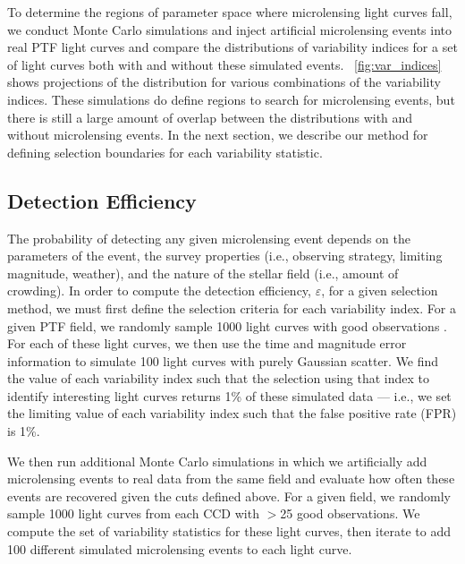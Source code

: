 \documentclass[12pt,preprint]{aastex}
\begin{document}
To determine the regions of parameter space where microlensing light curves fall, we conduct Monte Carlo simulations and inject artificial microlensing events into real PTF light curves and compare the distributions of variability indices for a set of light curves both with and without these simulated events. \figurename~\ref{fig:var_indices} shows projections of the distribution for various combinations of the variability indices. These simulations do define regions to search for microlensing events, but there is still a large amount of overlap between the distributions with and without microlensing events. In the next section, we describe our method for defining selection boundaries for each variability statistic.


\subsection{Detection Efficiency}
The probability of detecting any given microlensing event depends on the parameters of the event, the survey properties (i.e., observing strategy, limiting magnitude, weather), and the nature of the stellar field (i.e., amount of crowding). In order to compute the detection efficiency, $\varepsilon$, for a given selection method, we must first define the selection criteria for each variability index. For a given PTF field, we randomly sample 1000 light curves with good observations \citep[these have no photometric flags; see description of processing pipeline in][]{nick2009}. For each of these light curves, we then use the time and magnitude error information to simulate 100 light curves with purely Gaussian scatter. We find the value of each variability index such that the selection using that index to identify interesting light curves returns 1\% of these simulated data --- i.e., we set the limiting value of each variability index such that the false positive rate (FPR) is 1\%.

We then run additional Monte Carlo simulations in which we artificially add microlensing events to real data from the same field and evaluate how often these events are recovered given the cuts defined above. For a given field, we randomly sample 1000 light curves from each CCD with $>$25 good observations. We compute the set of variability statistics for these light curves, then iterate to add 100 different simulated microlensing events to each light curve. 
\end{document}

